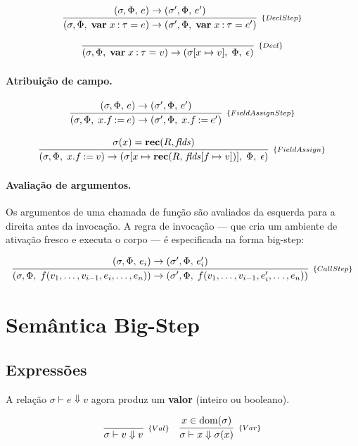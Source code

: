 \[
  \infer[_{\{DeclStep\}}]
  {(\sigma, \Phi,\; \mathbf{var}\; x \mathbin{:} \tau = e) \to
  (\sigma', \Phi,\; \mathbf{var}\; x \mathbin{:} \tau = e')}
  {(\sigma, \Phi,\, e) \to (\sigma', \Phi,\, e')}
\]

\[
  \infer[_{\{Decl\}}]
  {(\sigma, \Phi,\; \mathbf{var}\; x \mathbin{:} \tau = v) \to
  (\sigma[x \mapsto v],\; \Phi,\; \epsilon)}
  {}
\]

\paragraph{Atribuição de campo.}

\[
  \infer[_{\{FieldAssignStep\}}]
  {(\sigma, \Phi,\; x.f \mathbin{:=} e) \to
  (\sigma', \Phi,\; x.f \mathbin{:=} e')}
  {(\sigma, \Phi,\, e) \to (\sigma', \Phi,\, e')}
\]

\[
  \infer[_{\{FieldAssign\}}]
  {(\sigma, \Phi,\; x.f \mathbin{:=} v)
    \to (\sigma[x \mapsto \mathbf{rec}(R,\,\mathit{flds}[f \mapsto
  v])],\; \Phi,\; \epsilon)}
  {\sigma(x) = \mathbf{rec}(R,\mathit{flds})}
\]

\paragraph{Avaliação de argumentos.}

Os argumentos de uma chamada de função são avaliados da esquerda para
a direita antes da invocação. A regra de invocação — que cria um
ambiente de ativação fresco e executa o corpo — é especificada na
forma big-step:

\[
  \infer[_{\{CallStep\}}]
  {(\sigma, \Phi,\;
    f(v_1,\ldots,v_{i-1},e_i,\ldots,e_n)) \to
    (\sigma', \Phi,\;
  f(v_1,\ldots,v_{i-1},e_i',\ldots,e_n))}
  {(\sigma, \Phi,\, e_i) \to (\sigma', \Phi,\, e_i')}
\]

\section{Semântica Big-Step}

\subsection{Expressões}

A relação \(\sigma \vdash e \Downarrow v\) agora produz um
\textbf{valor} (inteiro ou booleano).

\[
  \begin{array}{cc}
    \infer[_{\{Val\}}]{\sigma \vdash v \Downarrow v}{}
    &
    \infer[_{\{Var\}}]{\sigma \vdash x
    \Downarrow \sigma(x)}{x \in \mathrm{dom}(\sigma)}
  \end{array}
\]

